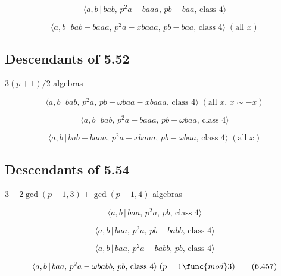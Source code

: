 \documentclass[10pt]{article}
\begin{document}
\begin{equation}
\langle a,b\,|\,bab,\,p^2a-baaa,\,pb-baa,\,\text{class }4\rangle  \tag{6.449}
\end{equation}

\begin{equation}
\langle a,b\,|\,bab-baaa,\,p^2a-xbaaa,\,pb-baa,\,\text{class }4\rangle\;(%
\text{all }x)  \tag{6.450}
\end{equation}

\subsection{Descendants of 5.52}

$3(p+1)/2$ algebras

\begin{equation}
\langle a,b\,|\,bab,\,p^2a,\,pb-\omega baa-xbaaa,\,\text{class }4\rangle\;(%
\text{all }x,\, x\sim -x)  \tag{6.451}
\end{equation}

\begin{equation}
\langle a,b\,|\,bab,\,p^2a-baaa,\,pb-\omega baa,\,\text{class }4\rangle 
\tag{6.452}
\end{equation}

\begin{equation}
\langle a,b\,|\,bab-baaa,\,p^2a-xbaaa,\,pb-\omega baa,\,\text{class }%
4\rangle\;(\text{all }x)  \tag{6.453}
\end{equation}

\subsection{Descendants of 5.54}

$3+2\gcd (p-1,3)+\gcd (p-1,4)$ algebras

\begin{equation}
\langle a,b\,|\,baa,\,p^2a,\,pb,\,\text{class }4\rangle  \tag{6.454}
\end{equation}

\begin{equation}
\langle a,b\,|\,baa,\,p^2a,\,pb-babb,\,\text{class }4\rangle  \tag{6.455}
\end{equation}

\begin{equation}
\langle a,b\,|\,baa,\,p^2a-babb,\,pb,\,\text{class }4\rangle  \tag{6.456}
\end{equation}

\begin{equation}
\langle a,b\,|\,baa,\,p^2a-\omega babb,\,pb,\,\text{class }4\rangle\;(p=1 
\func{mod} 3)  \tag{6.457}
\end{equation}
\end{document}
